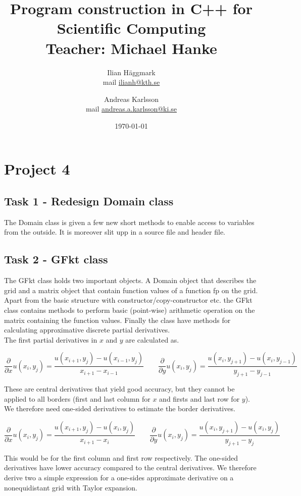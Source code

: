 \documentclass[paper=a4, fontsize=12pt]{article} %
\title{Program construction in C++ for Scientific Computing \\ Teacher: Michael Hanke}
\author{Ilian H{\"a}ggmark \\ mail \href{mailto:ilianh@kth.se}{ilianh@kth.se}
  \and Andreas Karlsson \\ mail \href{mailto:andreas.a.karlsson@ki.se}{andreas.a.karlsson@ki.se} }
\date{\normalsize\today} %
\begin{document}
\maketitle %

\section*{Project 4}
\subsection*{Task 1 - Redesign Domain class}

The Domain class is given a few new short methods to enable access to variables from the outside. It is moreover slit upp in a source file and header file.\\


\subsection*{Task 2 - GFkt class}

The GFkt class holds two important objects. A Domain object that describes the grid and a matrix object that contain function values of a function fp on the grid. Apart from the basic structure with constructor/copy-constructor etc. the GFkt class contains methods to perform basic (point-wise) arithmetic operation on the matrix containing the function values. Finally the class have methods for calculating approximative discrete partial derivatives. \\

The first partial derivatives in $x$ and $y$ are calculated as.

$$ \frac{\partial}{\partial x} u(x_i,y_j)  = \frac{u(x_{i+1},y_j)-u(x_{i-1},y_j)}{x_{i+1} - x_{i-1}} \qquad  \frac{\partial}{\partial y} u(x_i,y_j)  = \frac{u(x_{i},y_{j+1})-u(x_{i},y_{j-1})}{y_{j+1} - y_{j-1}}$$ 

These are central derivatives that yield good accuracy, but they cannot be applied to all borders (first and last column for $x$ and firsts and last row for $y$). We therefore need one-sided derivatives to estimate the border derivatives.

$$ \frac{\partial}{\partial x} u(x_i,y_j)  = \frac{u(x_{i+1},y_j)-u(x_{i},y_j)}{x_{i+1} - x_{i}} \qquad  \frac{\partial}{\partial y} u(x_i,y_j)  = \frac{u(x_{i},y_{j+1})-u(x_{i},y_{j})}{y_{j+1} - y_{j}}$$

This would be for the first column and first row respectively. The one-sided derivatives have lower accuracy compared to the central derivatives. We therefore derive two a simple expression for a one-sides approximate derivative on a nonequidistant grid with Taylor expansion. 
\end{document}
